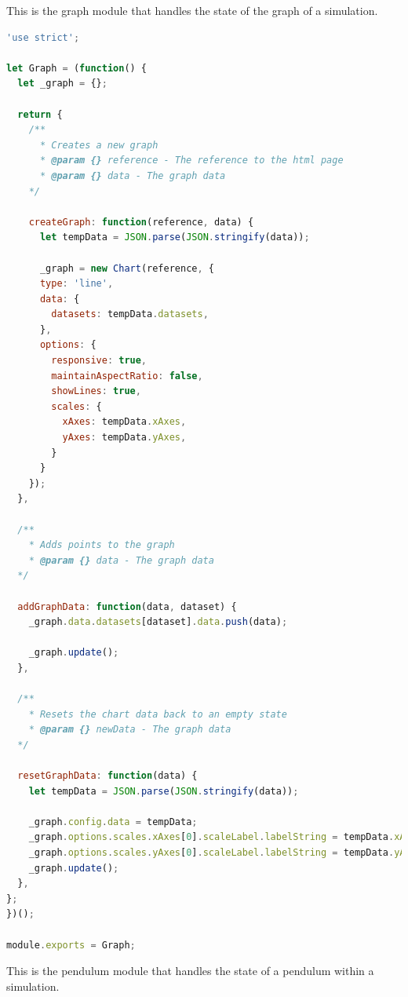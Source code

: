 \documentclass[onecolumn, draftclsnofoot,10pt, compsoc]{IEEEtran}
\begin{document}
This is the graph module that handles the state of the graph of a simulation.

\begin{lstlisting}[language=JavaScript]
'use strict';

let Graph = (function() {
  let _graph = {};

  return {
    /**
      * Creates a new graph
      * @param {} reference - The reference to the html page
      * @param {} data - The graph data
    */

    createGraph: function(reference, data) {
      let tempData = JSON.parse(JSON.stringify(data));

      _graph = new Chart(reference, {
      type: 'line',
      data: {
        datasets: tempData.datasets,
      },
      options: {
        responsive: true,
        maintainAspectRatio: false,
        showLines: true,
        scales: {
          xAxes: tempData.xAxes,
          yAxes: tempData.yAxes,
        }
      }
    });
  },

  /**
    * Adds points to the graph
    * @param {} data - The graph data
  */

  addGraphData: function(data, dataset) {
    _graph.data.datasets[dataset].data.push(data);

    _graph.update();
  },

  /**
    * Resets the chart data back to an empty state
    * @param {} newData - The graph data
  */

  resetGraphData: function(data) {
    let tempData = JSON.parse(JSON.stringify(data));

    _graph.config.data = tempData;
    _graph.options.scales.xAxes[0].scaleLabel.labelString = tempData.xAxes[0].scaleLabel.labelString;
    _graph.options.scales.yAxes[0].scaleLabel.labelString = tempData.yAxes[0].scaleLabel.labelString;
    _graph.update();
  },
};
})();

module.exports = Graph;
\end{lstlisting}

This is the pendulum module that handles the state of a pendulum within a simulation.
\end{document}

